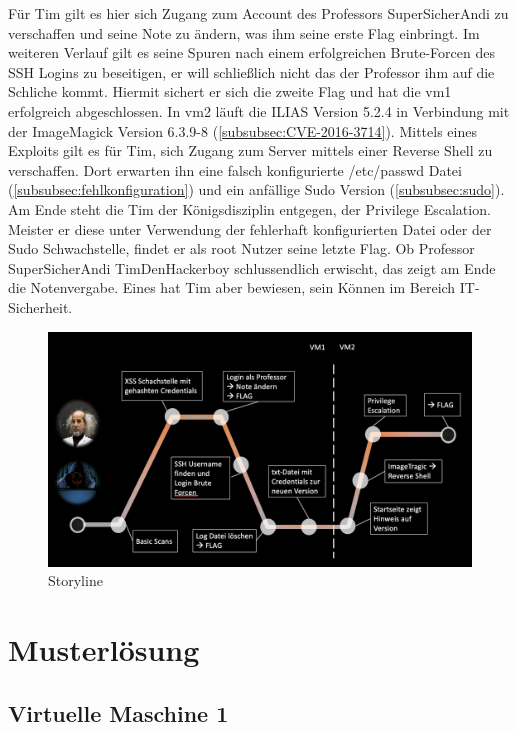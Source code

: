 \documentclass[10pt, a4paper,onecolumn ,titlepage]{article}
\begin{document}
    Für Tim gilt es hier sich Zugang zum Account des Professors SuperSicherAndi zu verschaffen und seine Note zu ändern, was ihm seine erste Flag einbringt.
    Im weiteren Verlauf gilt es seine Spuren nach einem erfolgreichen Brute-Forcen des SSH Logins zu beseitigen, er will schließlich nicht das der Professor ihm auf die Schliche kommt.
    Hiermit sichert er sich die zweite Flag und hat die \ac{vm}1 erfolgreich abgeschlossen.
    In \ac{vm}2 läuft die ILIAS Version 5.2.4 in Verbindung mit der ImageMagick Version 6.3.9-8 (\ref{subsubsec:CVE-2016-3714}).
    Mittels eines Exploits gilt es für Tim, sich Zugang zum Server mittels einer Reverse Shell zu verschaffen.
    Dort erwarten ihn eine falsch konfigurierte /etc/passwd Datei (\ref{subsubsec:fehlkonfiguration}) und ein anfällige Sudo Version (\ref{subsubsec:sudo}).
    Am Ende steht die Tim der Königsdisziplin entgegen, der Privilege Escalation.
    Meister er diese unter Verwendung der fehlerhaft konfigurierten Datei oder der Sudo Schwachstelle, findet er als root Nutzer seine letzte Flag.
    Ob Professor SuperSicherAndi TimDenHackerboy schlussendlich erwischt, das zeigt am Ende die Notenvergabe.
    Eines hat Tim aber bewiesen, sein Können im Bereich IT-Sicherheit.

    \begin{figure}[H]
        \centering
        \includegraphics[width=1\textwidth]{other_pictures/storyline}
        \caption{Storyline }
        \label{fig:storylineGraphic}
    \end{figure}

    \section{Musterlösung}
    \label{sec:musterloesung}

    \subsection{Virtuelle Maschine 1} %
    \label{subsec:vm1}
\end{document}
